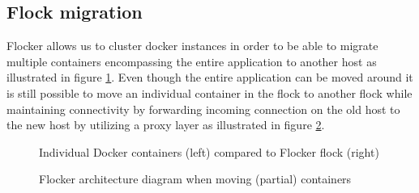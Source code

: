 \documentclass{article}
\begin{document}
\subsection{Flock migration}
Flocker allows us to cluster docker instances in order to be able to migrate multiple containers encompassing the entire application to another host as illustrated in figure \ref{fig:dockervsflocker}. Even though the entire application can be moved around it is still possible to move an individual container in the flock to another flock while maintaining connectivity by forwarding incoming connection on the old host to the new host by utilizing a proxy layer as illustrated in figure \ref{fig:flockermovearchitecture}.

\begin{figure}[h!]
  \centering
  \caption{Individual Docker containers (left) compared to Flocker flock (right)}
  \label{fig:dockervsflocker}
\end{figure}


\begin{figure}[h!]
  \centering
  \caption{Flocker architecture diagram when moving (partial) containers}
  \label{fig:flockermovearchitecture}
\end{figure}
\end{document}
